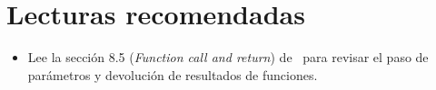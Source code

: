 \section{Lecturas recomendadas}

\begin{itemize}

\item Lee la sección 8.5 (\emph{Function call and return}) de~\cite{stroustrup:2014}
      para revisar el paso de parámetros y devolución de resultados de funciones.

\end{itemize}

